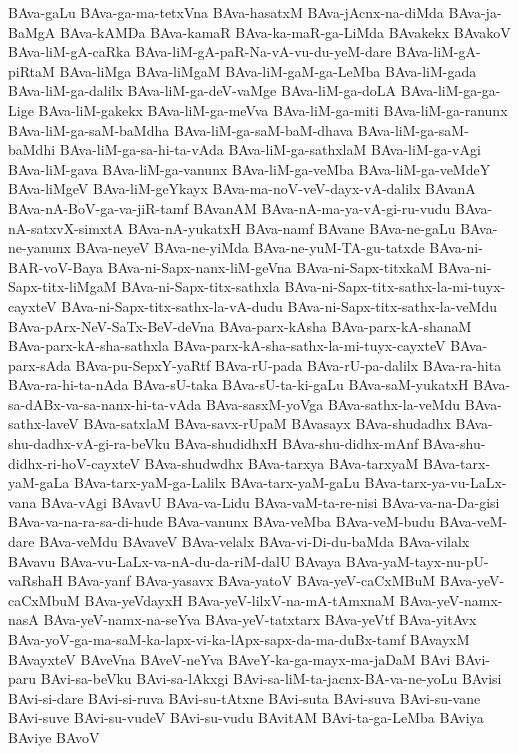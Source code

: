 {BAva-gaLu
BAva-ga-ma-tetxVna
BAva-hasatxM
BAva-jAcnx-na-diMda
BAva-ja-BaMgA
BAva-kAMDa
BAva-kamaR
BAva-ka-maR-ga-LiMda
BAvakekx
BAvakoV
BAva-liM-gA-caRka
BAva-liM-gA-paR-Na-vA-vu-du-yeM-dare
BAva-liM-gA-piRtaM
BAva-liMga
BAva-liMgaM
BAva-liM-gaM-ga-LeMba
BAva-liM-gada
BAva-liM-ga-dalilx
BAva-liM-ga-deV-vaMge
BAva-liM-ga-doLA
BAva-liM-ga-ga-Lige
BAva-liM-gakekx
BAva-liM-ga-meVva
BAva-liM-ga-miti
BAva-liM-ga-ranunx
BAva-liM-ga-saM-baMdha
BAva-liM-ga-saM-baM-dhava
BAva-liM-ga-saM-baMdhi
BAva-liM-ga-sa-hi-ta-vAda
BAva-liM-ga-sathxlaM
BAva-liM-ga-vAgi
BAva-liM-gava
BAva-liM-ga-vanunx
BAva-liM-ga-veMba
BAva-liM-ga-veMdeY
BAva-liMgeV
BAva-liM-geYkayx
BAva-ma-noV-veV-dayx-vA-dalilx
BAvanA
BAva-nA-BoV-ga-va-jiR-tamf
BAvanAM
BAva-nA-ma-ya-vA-gi-ru-vudu
BAva-nA-satxvX-simxtA
BAva-nA-yukatxH
BAva-namf
BAvane
BAva-ne-gaLu
BAva-ne-yanunx
BAva-neyeV
BAva-ne-yiMda
BAva-ne-yuM-TA-gu-tatxde
BAva-ni-BAR-voV-Baya
BAva-ni-Sapx-nanx-liM-geVna
BAva-ni-Sapx-titxkaM
BAva-ni-Sapx-titx-liMgaM
BAva-ni-Sapx-titx-sathxla
BAva-ni-Sapx-titx-sathx-la-mi-tuyx-cayxteV
BAva-ni-Sapx-titx-sathx-la-vA-dudu
BAva-ni-Sapx-titx-sathx-la-veMdu
BAva-pArx-NeV-SaTx-BeV-deVna
BAva-parx-kAsha
BAva-parx-kA-shanaM
BAva-parx-kA-sha-sathxla
BAva-parx-kA-sha-sathx-la-mi-tuyx-cayxteV
BAva-parx-sAda
BAva-pu-SepxY-yaRtf
BAva-rU-pada
BAva-rU-pa-dalilx
BAva-ra-hita
BAva-ra-hi-ta-nAda
BAva-sU-taka
BAva-sU-ta-ki-gaLu
BAva-saM-yukatxH
BAva-sa-dABx-va-sa-nanx-hi-ta-vAda
BAva-sasxM-yoVga
BAva-sathx-la-veMdu
BAva-sathx-laveV
BAva-satxlaM
BAva-savx-rUpaM
BAvasayx
BAva-shudadhx
BAva-shu-dadhx-vA-gi-ra-beVku
BAva-shudidhxH
BAva-shu-didhx-mAnf
BAva-shu-didhx-ri-hoV-cayxteV
BAva-shudwdhx
BAva-tarxya
BAva-tarxyaM
BAva-tarx-yaM-gaLa
BAva-tarx-yaM-ga-Lalilx
BAva-tarx-yaM-gaLu
BAva-tarx-ya-vu-LaLx-vana
BAva-vAgi
BAvavU
BAva-va-Lidu
BAva-vaM-ta-re-nisi
BAva-va-na-Da-gisi
BAva-va-na-ra-sa-di-hude
BAva-vanunx
BAva-veMba
BAva-veM-budu
BAva-veM-dare
BAva-veMdu
BAvaveV
BAva-velalx
BAva-vi-Di-du-baMda
BAva-vilalx
BAvavu
BAva-vu-LaLx-va-nA-du-da-riM-dalU
BAvaya
BAva-yaM-tayx-nu-pU-vaRshaH
BAva-yanf
BAva-yasavx
BAva-yatoV
BAva-yeV-caCxMBuM
BAva-yeV-caCxMbuM
BAva-yeVdayxH
BAva-yeV-lilxV-na-mA-tAmxnaM
BAva-yeV-namx-nasA
BAva-yeV-namx-na-seYva
BAva-yeV-tatxtarx
BAva-yeVtf
BAva-yitAvx
BAva-yoV-ga-ma-saM-ka-lapx-vi-ka-lApx-sapx-da-ma-duBx-tamf
BAvayxM
BAvayxteV
BAveVna
BAveV-neYva
BAveY-ka-ga-mayx-ma-jaDaM
BAvi
BAvi-paru
BAvi-sa-beVku
BAvi-sa-lAkxgi
BAvi-sa-liM-ta-jacnx-BA-va-ne-yoLu
BAvisi
BAvi-si-dare
BAvi-si-ruva
BAvi-su-tAtxne
BAvi-suta
BAvi-suva
BAvi-su-vane
BAvi-suve
BAvi-su-vudeV
BAvi-su-vudu
BAvitAM
BAvi-ta-ga-LeMba
BAviya
BAviye
BAvoV
}
